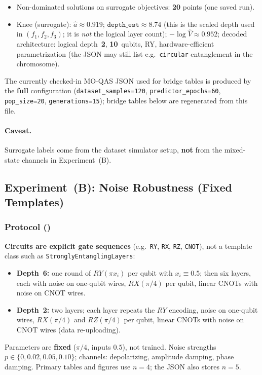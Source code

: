 \begin{itemize}
  \item Non-dominated solutions on surrogate objectives: \textbf{20} points
        (one saved run).
  \item Knee (surrogate): $\hat a\approx 0.919$;
        $\texttt{depth\_est}\approx 8.74$ (this is the scaled depth used in
        $(f_1,f_2,f_3)$; it is \emph{not} the logical layer count);
        $-\log\hat V\approx 0.952$;
        decoded architecture: logical depth~\textbf{2}, \textbf{10}~qubits, RY,
        hardware-efficient parametrization (the JSON may still list e.g.\
        \texttt{circular} entanglement in the chromosome).
\end{itemize}
\noindent
The currently checked-in MO-QAS JSON used for bridge tables is produced by the
\textbf{full} configuration (\texttt{dataset\_samples=120},
\texttt{predictor\_epochs=60}, \texttt{pop\_size=20},
\texttt{generations=15}); bridge tables below are regenerated from this file.

\paragraph{Caveat.}
Surrogate labels come from the dataset simulator setup, \textbf{not} from the
mixed-state channels in Experiment~(B).

\subsection{Experiment~(B): Noise Robustness (Fixed Templates)}\label{ssec:noise}

\subsubsection{Protocol ()}

\textbf{Circuits are explicit gate sequences} (e.g.\ \texttt{RY}, \texttt{RX},
\texttt{RZ}, \texttt{CNOT}), not a template class such as
\texttt{StronglyEntanglingLayers}:
\begin{itemize}
  \item \textbf{Depth~6:} one round of $RY(\pi x_i)$ per qubit with
        $x_i\equiv 0.5$; then six layers, each with noise on one-qubit wires,
        $RX(\pi/4)$ per qubit, linear CNOTs with noise on CNOT wires.
  \item \textbf{Depth~2:} two layers; each layer repeats the $RY$ encoding,
        noise on one-qubit wires, $RX(\pi/4)$ and $RZ(\pi/4)$ per qubit,
        linear CNOTs with noise on CNOT wires (data re-uploading).
\end{itemize}
Parameters are \textbf{fixed} ($\pi/4$, inputs $0.5$), not trained.
Noise strengths $p\in\{0,0.02,0.05,0.10\}$; channels:
depolarizing, amplitude damping, phase damping.
Primary tables and figures use $n=4$; the JSON also stores $n=5$.

